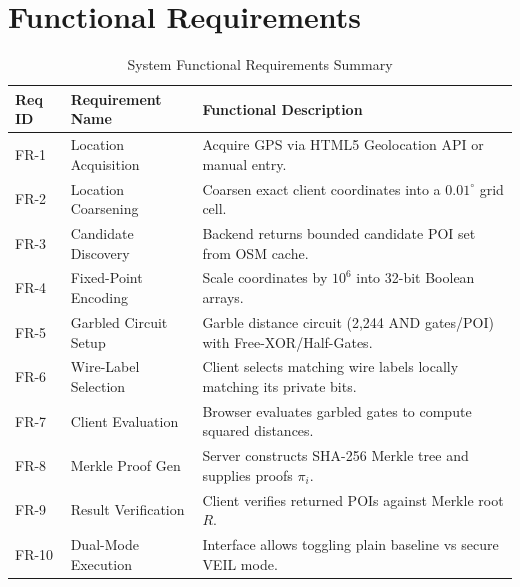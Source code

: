 \documentclass[12pt,a4paper,oneside]{report}
\begin{document}
\section{Functional Requirements}
\begin{table}[h!]
\centering
\caption{System Functional Requirements Summary}
\small
\begin{tabular}{p{2cm}p{4cm}p{8cm}}
\toprule
\textbf{Req ID} & \textbf{Requirement Name} & \textbf{Functional Description} \\
\midrule
FR-1 & Location Acquisition & Acquire GPS via HTML5 Geolocation API or manual entry. \\
FR-2 & Location Coarsening & Coarsen exact client coordinates into a $0.01^\circ$ grid cell. \\
FR-3 & Candidate Discovery & Backend returns bounded candidate POI set from OSM cache. \\
FR-4 & Fixed-Point Encoding & Scale coordinates by $10^6$ into 32-bit Boolean arrays. \\
FR-5 & Garbled Circuit Setup & Garble distance circuit (2,244 AND gates/POI) with Free-XOR/Half-Gates. \\
FR-6 & Wire-Label Selection & Client selects matching wire labels locally matching its private bits. \\
FR-7 & Client Evaluation & Browser evaluates garbled gates to compute squared distances. \\
FR-8 & Merkle Proof Gen & Server constructs SHA-256 Merkle tree and supplies proofs $\pi_i$. \\
FR-9 & Result Verification & Client verifies returned POIs against Merkle root $R$. \\
FR-10 & Dual-Mode Execution & Interface allows toggling plain baseline vs secure VEIL mode. \\
\bottomrule
\end{tabular}
\end{table}
\end{document}
